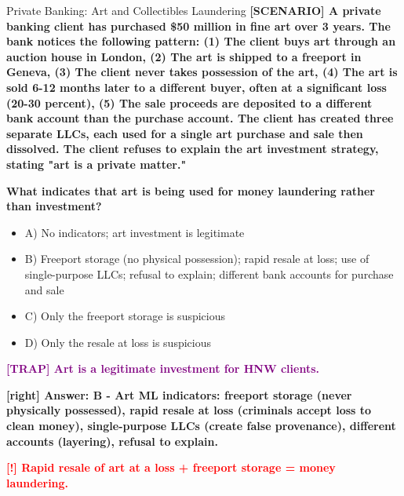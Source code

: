 \documentclass[11pt,a4paper]{beamer}
\newcommand{\redflag}[1]{\textcolor{red}{\textbf{[!] #1}}}
\newcommand{\trap}[1]{\textcolor{purple}{\textbf{[TRAP] #1}}}
\newcommand{\correct}[1]{\textcolor{green!50!black}{\textbf{[right] #1}}}
\newcommand{\scenario}[1]{\textcolor{blue!70!black}{\textbf{[SCENARIO] #1}}}
\begin{document}
	
	\begin{frame}{Private Banking: Art and Collectibles Laundering}
		\tiny
		\scenario{A private banking client has purchased \$50 million in fine art over 3 years. The bank notices the following pattern: (1) The client buys art through an auction house in London, (2) The art is shipped to a freeport in Geneva, (3) The client never takes possession of the art, (4) The art is sold 6-12 months later to a different buyer, often at a significant loss (20-30 percent), (5) The sale proceeds are deposited to a different bank account than the purchase account. The client has created three separate LLCs, each used for a single art purchase and sale then dissolved. The client refuses to explain the art investment strategy, stating "art is a private matter."}
		
		\vspace{0.02cm}
		\textbf{What indicates that art is being used for money laundering rather than investment?}
		\vspace{0.02cm}
		
		\begin{itemize}
			\item A) No indicators; art investment is legitimate
			\item B) Freeport storage (no physical possession); rapid resale at loss; use of single-purpose LLCs; refusal to explain; different bank accounts for purchase and sale
			\item C) Only the freeport storage is suspicious
			\item D) Only the resale at loss is suspicious
		\end{itemize}
		
		\vspace{0.02cm}
		\trap{Art is a legitimate investment for HNW clients.}
		
		\vspace{0.02cm}
		\correct{Answer: B - Art ML indicators: freeport storage (never physically possessed), rapid resale at loss (criminals accept loss to clean money), single-purpose LLCs (create false provenance), different accounts (layering), refusal to explain.}
		
		\vspace{0.02cm}
		\redflag{Rapid resale of art at a loss + freeport storage = money laundering.}
	\end{frame}
	
\end{document}
